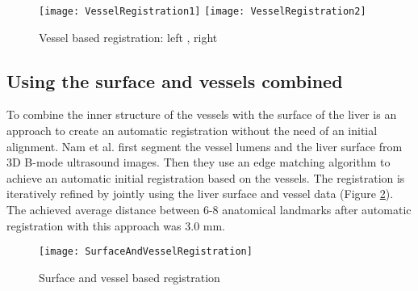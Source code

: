 \begin{figure}[H]
  \centering
 \texttt{[image: VesselRegistration1]}
  \endminipage
  \hfill
 \texttt{[image: VesselRegistration2]}
  \endminipage
  \hfill
 \caption{Vessel based registration: left \cite{ribes2012image}, right \cite{lange20093d}}
  \label{fig:VesselRegistration}
\end{figure}


\subsection{Using the surface and vessels combined}
To combine the inner structure of the vessels with the surface of the liver is
an approach to create an automatic registration without the need of an initial
alignment. Nam et al. \cite{nam2011automatic} first segment the vessel lumens and the liver surface from 3D
B-mode ultrasound images. Then they use an edge matching algorithm to achieve an
automatic initial registration based on the vessels. The registration is
iteratively refined by jointly using the liver surface and vessel data (Figure
\ref{fig:SurfaceAndVesselRegistration}). The achieved average distance between
6-8 anatomical landmarks after automatic registration with this approach was 3.0 mm.

\begin{figure}[H]
  \centering
 \texttt{[image: SurfaceAndVesselRegistration]}
 \caption{Surface and vessel based registration \cite{nam2011automatic}}
  \label{fig:SurfaceAndVesselRegistration}
\end{figure}




